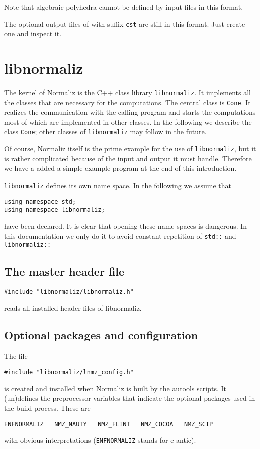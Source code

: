 \documentclass[12pt,a4paper]{scrartcl}
\theoremstyle{definition}
\begin{document}
Note that algebraic polyhedra cannot be defined by input files in this format.

The optional output files of with suffix \verb|cst| are still in this format. Just create one and inspect it.

\section{libnormaliz}\label{libnorm}

\begin{small}

The kernel of Normaliz is the C++ class library \verb|libnormaliz|. It implements all the classes that are necessary for the computations. The central class is \verb|Cone|. It realizes the communication with the calling program and starts the computations most of which are implemented in other classes. In the following we describe the class \verb|Cone|; other classes of \verb|libnormaliz| may follow in the future.

Of course, Normaliz itself is the prime example for the use of \verb|libnormaliz|, but it is rather complicated because of the input and output it must handle. Therefore we have a added a simple example program at the end of this introduction.

\verb|libnormaliz| defines its own name space. In the following we assume that
\begin{Verbatim}
using namespace std;
using namespace libnormaliz;
\end{Verbatim}
have been declared. It is clear that opening these name spaces is dangerous. In this documentation we only do it to avoid constant repetition of \verb|std::| and \verb|libnormaliz::|

\subsection{The master header file}

\begin{Verbatim}
#include "libnormaliz/libnormaliz.h"
\end{Verbatim}
 reads all installed header files of libnormaliz.
 
 \subsection{Optional packages and configuration}
 
 The file 
\begin{Verbatim}
#include "libnormaliz/lnmz_config.h"
\end{Verbatim}
is created and installed when Normaliz is built by the autools scripts. It  (un)defines the preprocessor variables that indicate the optional packages used in the build process. These are
\begin{Verbatim}
ENFNORMALIZ   NMZ_NAUTY   NMZ_FLINT   NMZ_COCOA   NMZ_SCIP
\end{Verbatim}
with obvious interpretations (\verb|ENFNORMALIZ| stands for e-antic).


\end{small}
\end{document}
